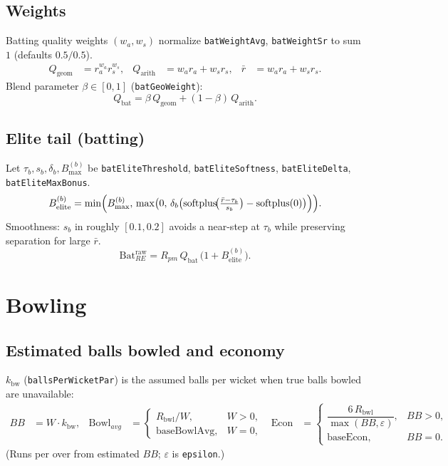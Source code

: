 \documentclass[12pt,a4paper]{article}
\newcommand{\softplus}{\operatorname{softplus}}
\begin{document}
\subsection{Weights}
Batting quality weights $(w_a,w_s)$ normalize \texttt{batWeightAvg}, \texttt{batWeightSr} to sum $1$ (defaults $0.5/0.5$).
\begin{align}
  Q_{\mathrm{geom}} &= r_a^{w_a} r_s^{w_s}, &
  Q_{\mathrm{arith}} &= w_a r_a + w_s r_s, &
  \bar r &= w_a r_a + w_s r_s.
\end{align}
Blend parameter $\beta\in[0,1]$ (\texttt{batGeoWeight}):
\begin{equation}
  Q_{\mathrm{bat}} = \beta\,Q_{\mathrm{geom}} + (1-\beta)\,Q_{\mathrm{arith}}.
\end{equation}

\subsection{Elite tail (batting)}
Let $\tau_b,s_b,\delta_b,B_{\max}^{(b)}$ be \texttt{batEliteThreshold}, \texttt{batEliteSoftness}, \texttt{batEliteDelta}, \texttt{batEliteMaxBonus}.
\begin{equation}
  B_{\mathrm{elite}}^{(b)}
  = \min\Bigl(B_{\max}^{(b)},\,\max\bigl(0,\,\delta_b\bigl(\softplus\!\bigl(\tfrac{\bar r-\tau_b}{s_b}\bigr)-\softplus(0)\bigr)\Bigr)\Bigr).
\end{equation}
Smoothness: $s_b$ in roughly $[0.1,0.2]$ avoids a near-step at $\tau_b$ while preserving separation for large $\bar r$.
\begin{equation}
  \mathrm{Bat}_{RE}^{\mathrm{raw}} = R_{pm}\,Q_{\mathrm{bat}}\,\bigl(1+B_{\mathrm{elite}}^{(b)}\bigr).
\end{equation}

\section{Bowling}
\subsection{Estimated balls bowled and economy}
$k_{\mathrm{bw}}$ (\texttt{ballsPerWicketPar}) is the assumed balls per wicket when true balls bowled are unavailable:
\begin{align}
  BB &= W\cdot k_{\mathrm{bw}}, &
  \mathrm{Bowl}_{avg} &=
  \begin{cases}
    R_{\mathrm{bwl}}/W, & W>0,\\
    \mathrm{baseBowlAvg}, & W=0,
  \end{cases}
  &
  \mathrm{Econ} &=
  \begin{cases}
    \dfrac{6\,R_{\mathrm{bwl}}}{\max(BB,\varepsilon)}, & BB>0,\\
    \mathrm{baseEcon}, & BB=0.
  \end{cases}
\end{align}
(Runs per over from estimated $BB$; $\varepsilon$ is \texttt{epsilon}.)
\end{document}
